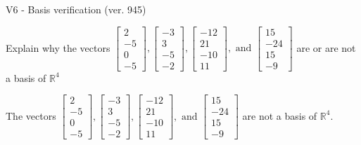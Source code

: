 \begin{exercise}
  \begin{exerciseTitle}V6 - Basis verification (ver. 945)\end{exerciseTitle}
  \begin{exerciseStatement}
    Explain why the vectors \(\left[\begin{array}{r}
2 \\
-5 \\
0 \\
-5
\end{array}\right] , \left[\begin{array}{r}
-3 \\
3 \\
-5 \\
-2
\end{array}\right] , \left[\begin{array}{r}
-12 \\
21 \\
-10 \\
11
\end{array}\right] , \text{ and } \left[\begin{array}{r}
15 \\
-24 \\
15 \\
-9
\end{array}\right]\) are or are not a basis of \(\mathbb{R}^4\)	


  \end{exerciseStatement}
  \begin{exerciseAnswer}
   The vectors \(\left[\begin{array}{r}
2 \\
-5 \\
0 \\
-5
\end{array}\right] , \left[\begin{array}{r}
-3 \\
3 \\
-5 \\
-2
\end{array}\right] , \left[\begin{array}{r}
-12 \\
21 \\
-10 \\
11
\end{array}\right] , \text{ and } \left[\begin{array}{r}
15 \\
-24 \\
15 \\
-9
\end{array}\right]\) 
  	 are not  a basis of \(\mathbb{R}^4\).
  


  \end{exerciseAnswer}
\end{exercise}